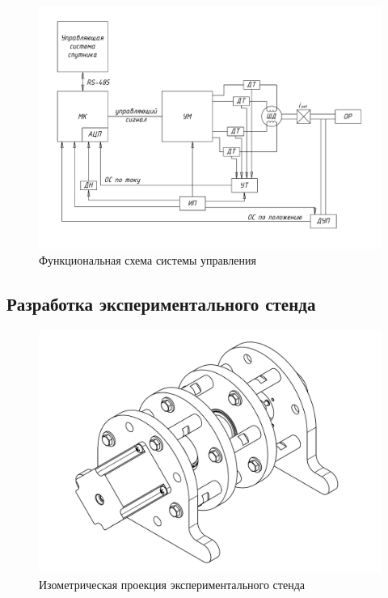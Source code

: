 \begin{figure}
    \centering
    \includegraphics[width=\linewidth, keepaspectratio,
                    clip=true, trim=21mm 21mm 21mm 20mm]
                    {src/pictures/functional_scheme_real}
    \caption{Функциональная схема системы управления}
    \label{functional_scheme}
\end{figure}



\newpage
\subsection{Разработка экспериментального стенда}
\label{sec_stand_construction}


\begin{figure}[ht!]
    \centering
    \includegraphics[width=\textwidth, scale=0.6, keepaspectratio]
                    {src/pictures/stand}
    \caption{Изометрическая проекция экспериментального стенда}
    \label{pic_stand}
\end{figure}

